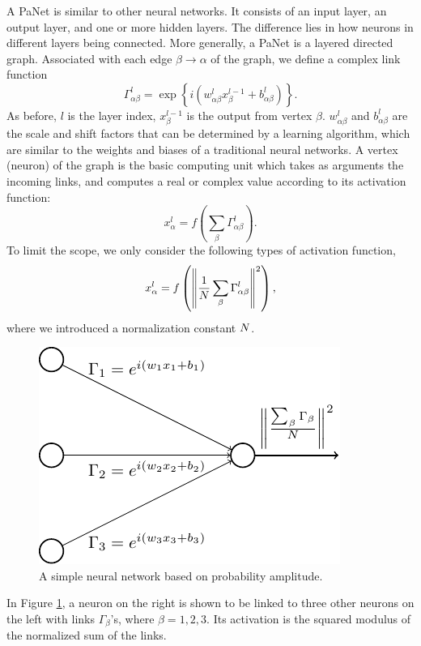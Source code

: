 \documentclass{article}
\begin{document}
A PaNet is similar to other neural networks. It consists of an input layer,
an output layer, and one or more hidden layers. The difference lies in how
neurons in different layers being connected. More generally, a PaNet is a
layered directed graph. Associated with each edge \(\beta \to \alpha\) of
the graph, we define a complex link function
\begin{equation}
  \label{eq:link}
  \Gamma^{l}_{\alpha\beta} = \exp\left\{i(w^{l}_{\alpha\beta}x^{l-1}_{\beta} + b^{l}_{\alpha\beta})\right\}.
\end{equation}
As before, \(l\) is the layer index, \(x^{l-1}_{\beta}\) is the output from
vertex \(\beta\). \(w^{l}_{\alpha\beta}\) and \(b^{l}_{\alpha\beta}\) are
the scale and shift factors that can be determined by a learning algorithm,
which are similar to the weights and biases of a traditional neural
networks. A vertex (neuron) of the graph is the basic computing unit which
takes as arguments the incoming links, and computes a real or complex value
according to its activation function:
\begin{equation*}
  x_{\alpha}^{l} = f\left(\sum_{\beta}\Gamma^{l}_{\alpha\beta}\right).
\end{equation*}
To limit the scope, we only consider the following types of activation function,
\begin{equation}
  \label{eq:af}
  x_{\alpha}^{l} = f\left(\left\|\frac{1}{\mathnormal{N}}\sum_{\beta}\Gamma^{l}_{\alpha\beta}\right\|^{2}\right),
\end{equation}
where we introduced a normalization constant \(\mathnormal{N}\).
\begin{figure}[htb]
  \centering
  \includegraphics{links}
  \caption{A simple neural network based on probability amplitude. }
  \label{fig:Network}
\end{figure} 
In Figure \ref{fig:Network}, a neuron on the right is shown to be linked to
three other neurons on the left with links \(\Gamma_{\beta}\)'s, where
\(\beta = 1, 2, 3\). Its activation is the squared modulus of the normalized
sum of the links.
\end{document}
